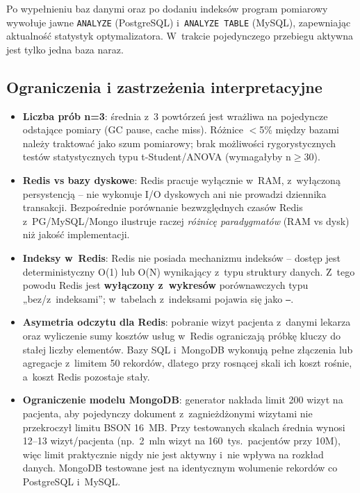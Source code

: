 \documentclass[12pt,a4paper]{article}
\begin{document}
Po wypełnieniu baz danymi oraz po dodaniu indeksów program pomiarowy wywołuje jawne \texttt{ANALYZE} (PostgreSQL) i~\texttt{ANALYZE TABLE} (MySQL), zapewniając aktualność statystyk optymalizatora. W~trakcie pojedynczego przebiegu aktywna jest tylko jedna baza naraz.

\subsection{Ograniczenia i zastrzeżenia interpretacyjne}

\begin{itemize}[noitemsep]
    \item \textbf{Liczba prób n=3}: średnia z~3 powtórzeń jest wrażliwa na pojedyncze odstające pomiary (GC pause, cache miss). Różnice $<$5\% między bazami należy traktować jako szum pomiarowy; brak możliwości rygorystycznych testów statystycznych typu t-Student/ANOVA (wymagałyby n$\geq$30).
    \item \textbf{Redis vs bazy dyskowe}: Redis pracuje wyłącznie w~RAM, z~wyłączoną persystencją -- nie wykonuje I/O dyskowych ani nie prowadzi dziennika transakcji. Bezpośrednie porównanie bezwzględnych czasów Redis z~PG/MySQL/Mongo ilustruje raczej \emph{różnicę paradygmatów} (RAM vs dysk) niż jakość implementacji.
    \item \textbf{Indeksy w~Redis}: Redis nie posiada mechanizmu indeksów -- dostęp jest deterministyczny O(1) lub O(N) wynikający z~typu struktury danych. Z~tego powodu Redis jest \textbf{wyłączony z~wykresów} porównawczych typu „bez/z~indeksami''; w~tabelach z~indeksami pojawia się jako \texttt{---}.
    \item \textbf{Asymetria odczytu dla Redis}: pobranie wizyt pacjenta z~danymi lekarza oraz wyliczenie sumy kosztów usług w~Redis ograniczają próbkę kluczy do stałej liczby elementów. Bazy SQL i~MongoDB wykonują pełne złączenia lub agregacje z~limitem 50 rekordów, dlatego przy rosnącej skali ich koszt rośnie, a~koszt Redis pozostaje stały.
    \item \textbf{Ograniczenie modelu MongoDB}: generator nakłada limit 200 wizyt na pacjenta, aby pojedynczy dokument z~zagnieżdżonymi wizytami nie przekroczył limitu BSON 16~MB. Przy testowanych skalach średnia wynosi 12--13 wizyt/pacjenta (np.\ 2~mln wizyt na 160~tys.\ pacjentów przy 10M), więc limit praktycznie nigdy nie jest aktywny i~nie wpływa na rozkład danych. MongoDB testowane jest na identycznym wolumenie rekordów co PostgreSQL i~MySQL.
\end{itemize}
\end{document}
